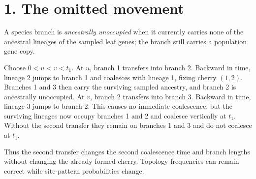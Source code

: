 \documentclass[10pt,twocolumn]{extarticle}
\begin{document}

\section*{1. The omitted movement}
A species branch is \emph{ancestrally unoccupied} when it currently carries none of the ancestral lineages of the sampled leaf genes; the branch still carries a population gene copy.

Choose $0<u<v<t_1$.  At $u$, branch 1 transfers into branch 2.  Backward in time, lineage 2 jumps to branch 1 and coalesces with lineage 1, fixing cherry $(1,2)$.  Branches 1 and 3 then carry the surviving sampled ancestry, and branch 2 is ancestrally unoccupied.  At $v$, branch 2 transfers into branch 3.  Backward in time, lineage 3 jumps to branch 2.  This causes no immediate coalescence, but the surviving lineages now occupy branches 1 and 2 and coalesce vertically at $t_1$.  Without the second transfer they remain on branches 1 and 3 and do not coalesce at $t_1$.

Thus the second transfer changes the second coalescence time and branch lengths without changing the already formed cherry.  Topology frequencies can remain correct while site-pattern probabilities change.
\end{document}
